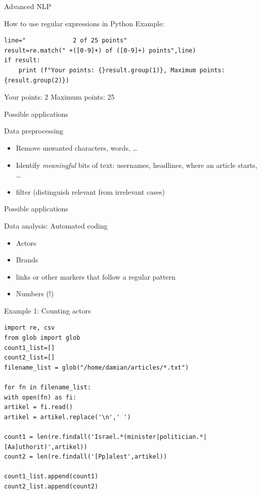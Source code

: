 \documentclass[compress]{beamer}
\begin{document}
\begin{section}{Advanced NLP}
\begin{frame}[fragile]{How to use regular expressions in Python}
Example:
\begin{lstlisting}
line="             2 of 25 points"
result=re.match(" +([0-9]+) of ([0-9]+) points",line)
if result:
    print (f"Your points: {}result.group(1)}, Maximum points: {result.group(2)})
\end{lstlisting}
Your points: 2 Maximum points: 25
\end{frame}



\begin{frame}{Possible applications}
\begin{block}{Data preprocessing}
\begin{itemize}
\item Remove unwanted characters, words, \ldots
\item Identify \emph{meaningful} bits of text: usernames, headlines, where an article starts, \ldots
\item filter (distinguish relevant from irrelevant cases)
\end{itemize}
\end{block}
\end{frame}


\begin{frame}{Possible applications}
\begin{block}{Data analysis: Automated coding}
\begin{itemize}
\item Actors
\item Brands
\item links or other markers that follow a regular pattern
\item Numbers (!)
\end{itemize}
\end{block}
\end{frame}

\begin{frame}{Example 1: Counting actors}
\begin{lstlisting}
import re, csv
from glob import glob
count1_list=[]
count2_list=[]
filename_list = glob("/home/damian/articles/*.txt")

for fn in filename_list:
with open(fn) as fi:
artikel = fi.read()
artikel = artikel.replace('\n',' ')

count1 = len(re.findall('Israel.*(minister|politician.*|[Aa]uthorit)',artikel))
count2 = len(re.findall('[Pp]alest',artikel))

count1_list.append(count1)
count2_list.append(count2)


\end{lstlisting}
\end{frame}
\end{section}
\end{document}
